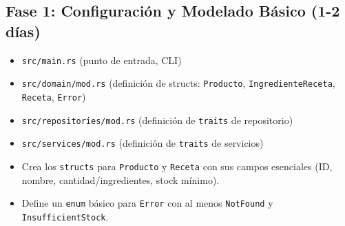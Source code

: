\documentclass{article}
\begin{document}
	\subsection{Fase 1: Configuración y Modelado Básico (1-2 días)}
		\begin{itemize}
			\item \texttt{src/main.rs} (punto de entrada, CLI)
			\item \texttt{src/domain/mod.rs} (definición de structs: \texttt{Producto}, \texttt{IngredienteReceta}, \texttt{Receta}, \texttt{Error})
			\item \texttt{src/repositories/mod.rs} (definición de \texttt{traits} de repositorio)
			\item \texttt{src/services/mod.rs} (definición de \texttt{traits} de servicios)
		\end{itemize}
		\begin{itemize}
			\item Crea los \texttt{structs} para \texttt{Producto} y \texttt{Receta} con sus campos esenciales (ID, nombre, cantidad/ingredientes, stock mínimo).
			\item Define un \texttt{enum} básico para \texttt{Error} con al menos \texttt{NotFound} y \texttt{InsufficientStock}.
		\end{itemize}
	
\end{document}
